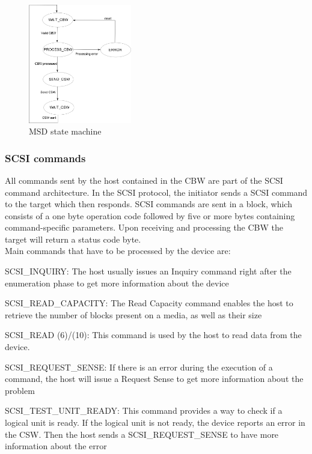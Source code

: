 \documentclass[pdftex,10pt,a4paper]{report}
\newenvironment{packed_item}{
\begin{itemize}
  \setlength{\itemsep}{1pt}
  \setlength{\parskip}{0pt}
  \setlength{\parsep}{0pt}
}{\end{itemize}}
\begin{document}
\begin{figure}[h!]
		\centering
		\includegraphics[width=0.4\textwidth]{./msd_state_machine.jpg}
		\caption{MSD state machine}
		\label{MSD state machine}
\end{figure}


\subsubsection{SCSI commands}
All commands sent by the host contained in the CBW are part of the SCSI command architecture. In the SCSI protocol, the initiator sends a SCSI command to the target which then responds. SCSI commands are sent in a block, which consists of a one byte operation code followed by five or more bytes containing command-specific parameters. Upon receiving and processing the CBW the target will return a status code byte.\\


Main commands that have to be processed by the device are:
\begin{packed_item}
	\item SCSI\_INQUIRY: The host usually issues an Inquiry command right after the enumeration phase to get more
information about the device

	\item SCSI\_READ\_CAPACITY: The Read Capacity command enables the host to retrieve the number of blocks present on a
media, as well as their size

	\item SCSI\_READ (6)/(10): This command is used by the host to read data from the device.
	
	\item SCSI\_REQUEST\_SENSE: If there is an error during the execution of a command, the host will issue a
Request Sense to get more information about the problem

	\item SCSI\_TEST\_UNIT\_READY: This command provides a way to check if a logical unit is ready. If the logical unit is not ready, the device reports an error in the CSW. Then the host sends a SCSI\_REQUEST\_SENSE to have more information about the error
\end{packed_item}
\end{document}
